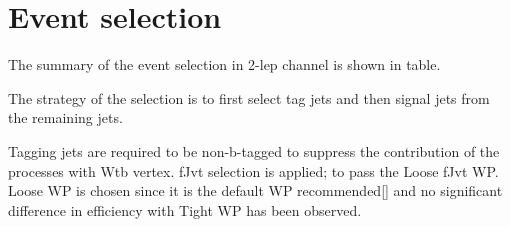 \chapter{Event selection}

The summary of the event selection in 2-lep channel is shown in table.

The strategy of the selection is to first select tag jets and then signal jets from the remaining jets.

Tagging jets are required to be non-b-tagged to suppress the contribution of the processes with Wtb vertex.
fJvt selection is applied; to pass the Loose fJvt WP. Loose WP is chosen since it is the default WP recommended[] and no significant difference in efficiency with Tight WP has been observed.